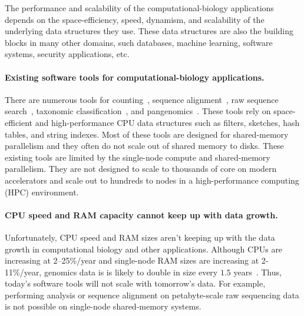 The performance and scalability of the computational-biology applications
depends on the space-efficiency, speed, dynamism, and scalability of the
underlying data structures they use. These data structures are also the building
blocks in many other domains, such databases, machine learning, software
systems, security applications, etc.


\paragraph{Existing software tools for computational-biology applications.}

There are numerous tools for \kmer counting~\cite{MarccaisKi11,PandeyBJP17a}, sequence alignment~\cite{altschul1990basic,kielbasa2011adaptive,li2018minimap2,schwartz2003human}, raw sequence search~\cite{solomon2016fast,PandeyABFJP18Cell}, taxonomic classification~\cite{wood2014kraken,wood2019improved}, and pangenomics~\cite{garrison2018variation,pandey2021variantstore}. These tools rely on space-efficient and high-performance CPU data structures such as filters, sketches, hash tables, and string indexes. Most of these tools are designed for shared-memory parallelism and they often do not scale out of shared memory to disks.
These existing tools are limited by the single-node compute and shared-memory parallelism. They are not designed to scale to thousands of core on modern accelerators and scale out to hundreds to nodes in a high-performance computing (HPC) environment.
%


\paragraph{CPU speed and RAM capacity cannot keep up with data growth.}
Unfortunately, CPU speed and RAM sizes aren't keeping up with the data growth in computational biology and other applications.
Although CPUs are increasing at 2--25\%/year and single-node RAM sizes are increasing at 2-11\%/year, genomics data is is likely to double in size every $1.5$ years~\cite{kodama2012sequence}.
Thus, today's software tools will not scale with tomorrow's data. For example, performing \kmer analysis or sequence alignment on petabyte-scale raw sequencing data is not possible on single-node shared-memory systems.

